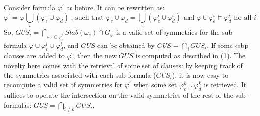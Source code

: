 Consider formula $\varphi^\prime$ as before. It can be rewritten as:
$$\varphi^\prime=\varphi \, \underset{i}{\bigcup}(\varphi_e \cup \varphi_d) \text{ , such that } \varphi_e \cup \varphi_d = \underset{i}{\bigcup}(\varphi_e^i \cup \varphi_d^i) \text{ and } \varphi \cup \varphi_e^i \models \varphi_d^i  \text{ for all } i$$
So, $GUS_i = \underset{\omega_e \in \varphi_e^i}{\bigcap}Stab(\omega_e) \cap G_{\varphi}$ is a valid set of symmetries for the sub-formula $\varphi \cup \varphi_e^i \cup \varphi_d^i$, and $GUS$ can be obtained by $GUS = \underset{i}{\bigcap} GUS_i$. If some esbp clauses are added to $\varphi^\prime$, then the new $GUS$ is computed as described in (1). The novelty here comes with the retrieval of some set of clauses: by keeping track of the symmetries associated with each sub-formula ($GUS_i$), it is now easy to recompute a valid set of symmetries for $\varphi^\prime$ when some set
$\varphi_e^k \cup \varphi_d^k$ is retrieved. It suffices to operate the intersection on the valid symmetries of the rest of the sub-formulas: $GUS = \underset{i \neq k}{\bigcap} GUS_i$.
